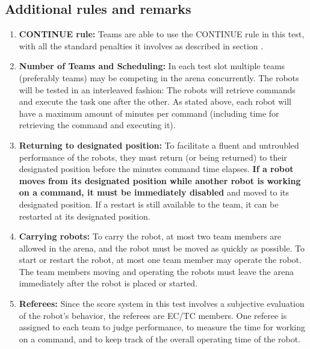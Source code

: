 \subsection{Additional rules and remarks}
\label{sec:eegpsr-remarks}
\begin{enumerate}
	\item \textbf{CONTINUE rule:} Teams are able to use the CONTINUE rule in this test, with all the standard penalties it involves as described in section .
	\\

	\item \textbf{Number of Teams and Scheduling:} In each test slot multiple teams (preferably \eegpsrTeams teams) may be competing in the arena concurrently. The robots will be tested in an interleaved fashion: The robots will retrieve commands and execute the task one after the other. As stated above, each robot will have a maximum amount of \eegpsrMaxCmdTime minutes per command (including time for retrieving the command and executing it). \\
	
	\item \textbf{Returning to designated position:} To facilitate a fluent and untroubled performance of the robots, they must return (or being returned) to their designated position before the \eegpsrMaxCmdTime minutes command time elapses. \textbf{If a robot moves from its designated position while another robot is working on a command, it must be immediately disabled} and moved to its designated position. If a restart is still available to the team, it can be restarted at its designated position. \\

	\item \textbf{Carrying robots:}	To carry the robot, at most two team members are allowed in the arena, and the robot must be moved as quickly as possible. To start or restart the robot, at most one team member may operate the robot. The team members moving and operating the robots must leave the arena immediately after the robot is placed or started. \\

	\item \textbf{Referees:} Since the score system in this test involves a subjective evaluation of the robot's behavior, the referees are EC/TC members. One referee is assigned to each team to judge performance, to measure the time for working on a command, and to keep track of the overall operating time of the robot. \\


\end{enumerate}
